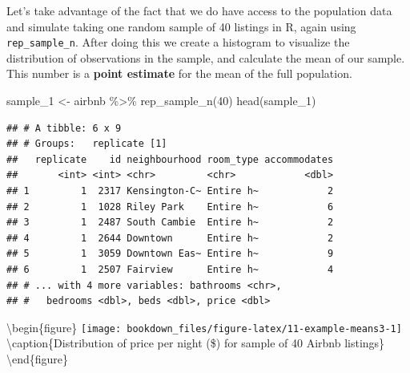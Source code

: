 \documentclass[
]{krantz}
\makeatletter
\newenvironment{Shaded}{\begin{snugshade}}{\end{snugshade}}
\newcommand{\AttributeTok}[1]{\textcolor[rgb]{0.61,0.61,0.61}{#1}}
\newcommand{\DecValTok}[1]{\textcolor[rgb]{0.06,0.06,0.06}{#1}}
\newcommand{\FunctionTok}[1]{\textcolor[rgb]{0,0,0}{#1}}
\newcommand{\NormalTok}[1]{#1}
\newcommand{\OtherTok}[1]{\textcolor[rgb]{0.37,0.37,0.37}{#1}}
\newcommand{\SpecialCharTok}[1]{\textcolor[rgb]{0,0,0}{#1}}
\newcommand{\StringTok}[1]{\textcolor[rgb]{0.5,0.5,0.5}{#1}}
\newenvironment{kframe}{%
\medskip{}
\setlength{\fboxsep}{.8em}
 \def\at@end@of@kframe{}%
 \ifinner\ifhmode%
  \def\at@end@of@kframe{\end{minipage}}%
  \begin{minipage}{\columnwidth}%
 \fi\fi%
 \def\FrameCommand##1{\hskip\@totalleftmargin \hskip-\fboxsep
 \colorbox{shadecolor}{##1}\hskip-\fboxsep
     \hskip-\linewidth \hskip-\@totalleftmargin \hskip\columnwidth}%
 \MakeFramed {\advance\hsize-\width
   \@totalleftmargin\z@ \linewidth\hsize
   \@setminipage}}%
 {\par\unskip\endMakeFramed%
 \at@end@of@kframe}
\renewenvironment{Shaded}{\begin{kframe}}{\end{kframe}}
\makeatother
\begin{document}
Let's take advantage of the fact that we do have access to the population data and simulate taking one random sample of 40 listings in R, again using \texttt{rep\_sample\_n}. After doing this we create a histogram to visualize the
distribution of observations in the sample,
and calculate the mean of our sample. This number is a \textbf{point estimate} for the mean of the full population.

\begin{Shaded}
\begin{Highlighting}[]
\NormalTok{sample\_1 }\OtherTok{\textless{}{-}}\NormalTok{ airbnb }\SpecialCharTok{\%\textgreater{}\%}
  \FunctionTok{rep\_sample\_n}\NormalTok{(}\DecValTok{40}\NormalTok{)}
\FunctionTok{head}\NormalTok{(sample\_1)}
\end{Highlighting}
\end{Shaded}

\begin{verbatim}
## # A tibble: 6 x 9
## # Groups:   replicate [1]
##   replicate    id neighbourhood room_type accommodates
##       <int> <int> <chr>         <chr>            <dbl>
## 1         1  2317 Kensington-C~ Entire h~            2
## 2         1  1028 Riley Park    Entire h~            6
## 3         1  2487 South Cambie  Entire h~            2
## 4         1  2644 Downtown      Entire h~            2
## 5         1  3059 Downtown Eas~ Entire h~            9
## 6         1  2507 Fairview      Entire h~            4
## # ... with 4 more variables: bathrooms <chr>,
## #   bedrooms <dbl>, beds <dbl>, price <dbl>
\end{verbatim}

\begin{Shaded}
\end{Shaded}

\textbackslash begin\{figure\}
\texttt{[image: bookdown\_files/figure-latex/11-example-means3-1]} \textbackslash caption\{Distribution of price per night (\$) for sample of 40 Airbnb listings\}\label{fig:11-example-means3}
\textbackslash end\{figure\}
\end{document}
